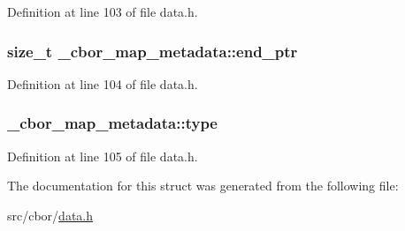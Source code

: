 Definition at line 103 of file data.\-h.

\hypertarget{struct__cbor__map__metadata_a38136af91105ba320f1d95a4a4ceb4de}{
\subsubsection[{end\-\_\-ptr}]{\setlength{\rightskip}{0pt plus 5cm}size\-\_\-t \-\_\-cbor\-\_\-map\-\_\-metadata\-::end\-\_\-ptr}}\label{struct__cbor__map__metadata_a38136af91105ba320f1d95a4a4ceb4de}


Definition at line 104 of file data.\-h.

\hypertarget{struct__cbor__map__metadata_aace4f7da19acf93e56eeb8ccf0fae7b5}{
\subsubsection[{type}]{ \-\_\-cbor\-\_\-map\-\_\-metadata\-::type}}\label{struct__cbor__map__metadata_aace4f7da19acf93e56eeb8ccf0fae7b5}


Definition at line 105 of file data.\-h.



The documentation for this struct was generated from the following file\-:\begin{DoxyCompactItemize}
\item 
src/cbor/\hyperlink{data_8h}{data.\-h}\end{DoxyCompactItemize}
